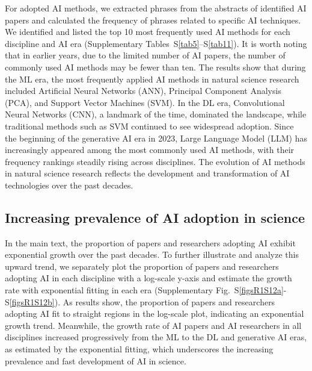 For adopted AI methods, we extracted phrases from the abstracts of identified AI papers and calculated the frequency of phrases related to specific AI techniques. We identified and listed the top 10 most frequently used AI methods for each discipline and AI era (Supplementary Tables~S\ref{tab5}–S\ref{tab11}).
It is worth noting that in earlier years, due to the limited number of AI papers, the number of commonly used AI methods may be fewer than ten.
The results show that during the ML era, the most frequently applied AI methods in natural science research included Artificial Neural Networks (ANN), Principal Component Analysis (PCA), and Support Vector Machines (SVM).
In the DL era, Convolutional Neural Networks (CNN), a landmark of the time, dominated the landscape, while traditional methods such as SVM continued to see widespread adoption.
Since the beginning of the generative AI era in 2023, Large Language Model (LLM) has increasingly appeared among the most commonly used AI methods, with their frequency rankings steadily rising across disciplines.
The evolution of AI methods in natural science research reflects the development and transformation of AI technologies over the past decades.




\subsection{Increasing prevalence of AI adoption in science}
\label{Increasing prevalence of AI in science}
In the main text, the proportion of papers and researchers adopting AI exhibit exponential growth over the past decades.
To further illustrate and analyze this upward trend, we separately plot the proportion of papers and researchers adopting AI in each discipline with a log-scale y-axis and estimate the growth rate with exponential fitting in each era (Supplementary Fig.~S\ref{figsR1S12a}-S\ref{figsR1S12b}).
As results show, the proportion of papers and researchers adopting AI fit to straight regions in the log-scale plot, indicating an exponential growth trend.
Meanwhile, the growth rate of AI papers and AI researchers in all disciplines increased progressively from the ML to the DL and generative AI eras, as estimated by the exponential fitting, which underscores the increasing prevalence and fast development of AI in science.

